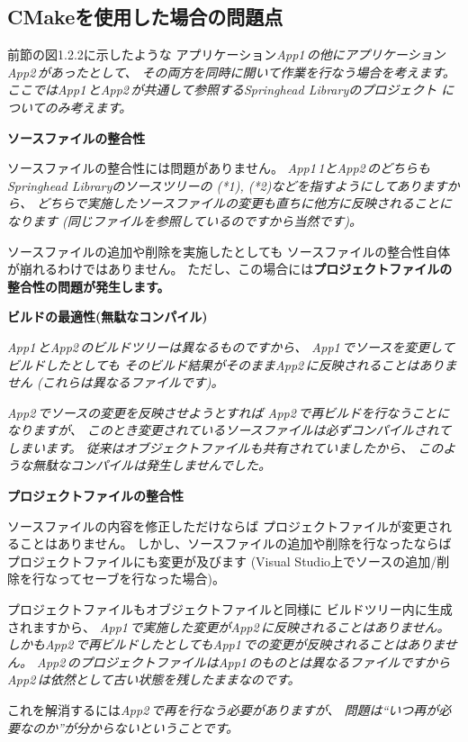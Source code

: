 \newpage
\subsection{CMakeを使用した場合の問題点}
\label{subsec:Problems}

\def\App#1{\it{App#1\,}}
\def\App#1{\it{App#1\,}}

\noindent
前節の図1.2.2に示したような
アプリケーション\App{1}の他にアプリケーション\App{2}があったとして、
その両方を同時に開いて作業を行なう場合を考えます。
ここでは\App{1}と\App{2}が共通して参照するSpringhead Libraryのプロジェクト
についてのみ考えます。

\bigskip
\noindent
\bf{ソースファイルの整合性}
\begin{narrow}[20pt]
	ソースファイルの整合性には問題がありません。
	\App1{1}と\App{2}のどちらもSpringhead Libraryのソースツリーの
	(*1), (*2)などを指すようにしてありますから、
	どちらで実施したソースファイルの変更も直ちに他方に反映されることになります
	(同じファイルを参照しているのですから当然です)。

	ソースファイルの追加や削除を実施したとしても
	ソースファイルの整合性自体が崩れるわけではありません。
	ただし、この場合には\bf{プロジェクトファイルの整合性}の問題が発生します。
\end{narrow}

\medskip
\noindent
\bf{ビルドの最適性(無駄なコンパイル)}
\begin{narrow}[20pt]
	\App{1}と\App{2}のビルドツリーは異なるものですから、
	\App{1}でソースを変更してビルドしたとしても
	そのビルド結果がそのまま\App{2}に反映されることはありません
	(これらは異なるファイルです)。

	\App{2}でソースの変更を反映させようとすれば
	\App{2}で再ビルドを行なうことになりますが、
	このとき変更されているソースファイルは必ずコンパイルされてしまいます。
	従来はオブジェクトファイルも共有されていましたから、
	このような無駄なコンパイルは発生しませんでした。
\end{narrow}

\medskip
\noindent
\bf{プロジェクトファイルの整合性}
\begin{narrow}[20pt]
	ソースファイルの内容を修正しただけならば
	プロジェクトファイルが変更されることはありません。
	しかし、ソースファイルの追加や削除を行なったならば
	プロジェクトファイルにも変更が及びます
	(Visual Studio上でソースの追加/削除を行なってセーブを行なった場合)。

	プロジェクトファイルもオブジェクトファイルと同様に
	ビルドツリー内に生成されますから、
	\App{1}で実施した変更が\App{2}に反映されることはありません。
	しかも\App{2}で再ビルドしたとしても\App{1}での変更が反映されることはありません。
	\App{2}のプロジェクトファイルは\App{1}のものとは異なるファイルですから
	\App{2}は依然として古い状態を残したままなのです。

	これを解消するには\App{2}で再\cmake を行なう必要がありますが、
	問題は``いつ再\cmake が必要なのか''が分からないということです。
\end{narrow}

